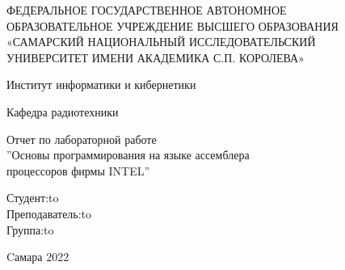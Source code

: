 \begin{titlepage}
\newpage
\doublespacing
\begin{center}
ФЕДЕРАЛЬНОЕ ГОСУДАРСТВЕННОЕ АВТОНОМНОЕ\\
ОБРАЗОВАТЕЛЬНОЕ УЧРЕЖДЕНИЕ ВЫСШЕГО ОБРАЗОВАНИЯ\\
«САМАРСКИЙ НАЦИОНАЛЬНЫЙ ИССЛЕДОВАТЕЛЬСКИЙ\\
УНИВЕРСИТЕТ ИМЕНИ АКАДЕМИКА С.П. КОРОЛЕВА»	
 \\
\end{center}

\vspace{5em}

\begin{center}
 Институт информатики и кибернетики \\ 
\end{center}

\begin{center}
Кафедра радиотехники \\ 
\end{center}


\vspace{3em}

\begin{center}
{Отчет по лабораторной работе\\''Основы программирования на языке ассемблера \\процессоров фирмы INTEL''}
\end{center}

\vspace{14em}
\newbox{\lbox}
\newlength{\maxl}
\setlength{\maxl}{\wd\lbox}
\hfill\parbox{7cm}{
\hspace*{4cm}\hspace*{-4cm}Студент:\hfill\hbox to\\
\hspace*{4cm}\hspace*{-4cm}Преподаватель:\hfill\hbox to\\
\hspace*{4cm}\hspace*{-4cm}Группа:\hfill\hbox to\\
}




\vspace{\fill}

\begin{center}
Cамара 2022
\end{center}

\end{titlepage}